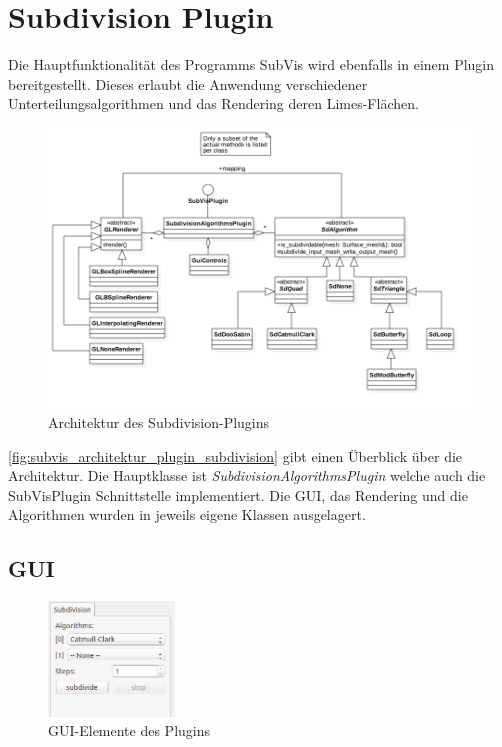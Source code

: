 \chapter{Subdivision Plugin}

Die Hauptfunktionalität des Programms SubVis wird ebenfalls in einem Plugin bereitgestellt. 
Dieses erlaubt die Anwendung verschiedener Unterteilungsalgorithmen und das Rendering deren Limes-Flächen.

\begin{figure}
  \centering
  \includegraphics[width=\textwidth]{content/media/subvis_architektur_plugin_subdivision.png}
  \caption{Architektur des Subdivision-Plugins}
  \label{fig:subvis_architektur_plugin_subdivision}
\end{figure}

\autoref{fig:subvis_architektur_plugin_subdivision} gibt einen Überblick über die Architektur.
Die Hauptklasse ist \emph{SubdivisionAlgorithmsPlugin} welche auch die SubVisPlugin Schnittstelle implementiert.
Die GUI, das Rendering und die Algorithmen wurden in jeweils eigene Klassen ausgelagert.

\section{GUI}

\begin{figure}
  \centering
  \includegraphics[width=0.3\textwidth]{content/media/subvis_plugin.png}
  \caption{GUI-Elemente des Plugins}
  \label{fig:subivs_plugin_gui}
\end{figure}

